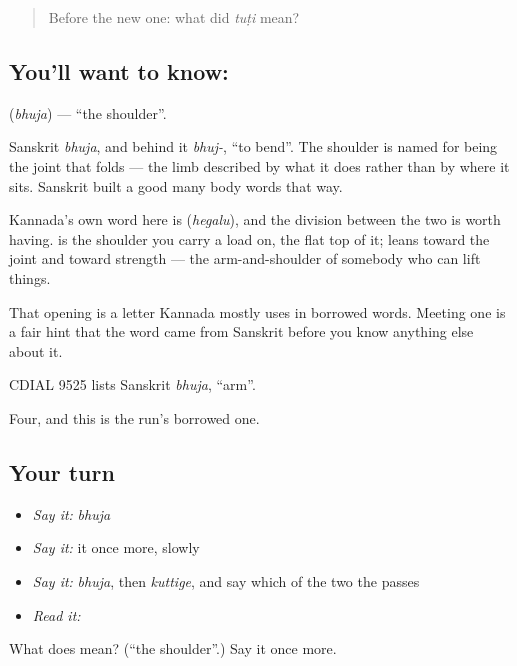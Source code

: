 \label{lesson:KA-C57-shoulder}



\begin{quote}
Before the new one: what did \emph{tuṭi} mean?
\end{quote}

\subsection*{You'll want to know: }
\textbf{} (\emph{bhuja}) — \textquotedblleft{}the shoulder\textquotedblright{}.

Sanskrit \emph{bhuja}, and behind it \emph{bhuj-}, \textquotedblleft{}to bend\textquotedblright{}. The shoulder is named for being the joint that folds — the limb described by what it does rather than by where it sits. Sanskrit built a good many body words that way.

Kannada's own word here is  (\emph{hegalu}), and the division between the two is worth having.  is the shoulder you carry a load on, the flat top of it;  leans toward the joint and toward strength — the arm-and-shoulder of somebody who can lift things.

That opening  is a letter Kannada mostly uses in borrowed words. Meeting one is a fair hint that the word came from Sanskrit before you know anything else about it.

CDIAL 9525 lists Sanskrit \emph{bhuja}, \textquotedblleft{}arm\textquotedblright{}.

\begin{grammarlens}[title={What you've built}]
Four, and this is the run's borrowed one.
\end{grammarlens}

\subsection*{Your turn}
\begin{itemize}
\raggedright
  \item \emph{Say it:} \emph{bhuja}
  \item \emph{Say it:} it once more, slowly
  \item \emph{Say it:} \emph{bhuja}, then \emph{kuttige}, and say which of the two the  passes
  \item \emph{Read it:} \textbf{}
\end{itemize}

\begin{tcolorbox}[breakable,colback=teal!4,colframe=teal!35!black,title={Before you move on}]
What does  mean? (\textquotedblleft{}the shoulder\textquotedblright{}.) Say it once more.
\end{tcolorbox}
